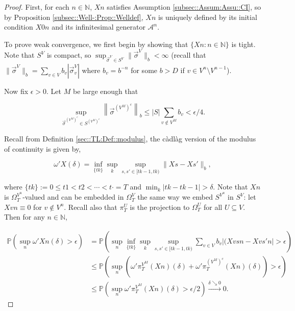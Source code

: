 \documentclass[12pt]{article}
\newcommand{\mb}{\mathbb}
\newcommand{\mc}{\mathcal}
\newcommand{\ra}{\rightarrow}
\newcommand{\os}{\overset}
\newcommand{\ep}{\epsilon}
\newcommand{\ind}{\hspace{24pt}}
\newcommand{\pr}{\mb{P}}							%
\renewcommand{\v}{v}							%
\renewcommand{\U}{U}							%
\renewcommand{\S}{S}							%
\newcommand{\s}{\sigma}							%
\newcommand{\sv}{\vec{\s}}						%
\renewcommand{\b}{b}							%
\newcommand{\T}{T}								%
\renewcommand{\t}{t}							%
\newcommand{\sset}{\Omega}						%
\newcommand{\proj}{\pi}							%
\renewcommand{\tt}{s}							%
\newcommand{\ttt}{s'}							%
\newcommand{\X}{X}								%
\newcommand{\IG}{\mc{A}}						%
\newcommand{\carp}[1]{^{#1}}					%
\newcommand{\vsi}[1]{^{#1}}						%
\newcommand{\cind}[1]{_{#1}}					%
\newcommand{\ts}[1]{_{#1}}						%
\newcommand{\degr}{D}							%
\newcommand{\sln}[1]{^{#1}}						%
\newcommand{\cconst}{M}							%
\newcommand{\cmodu}{\omega'}					%
\renewcommand{\it}{k}							%
\begin{document}
\begin{proof}
First, for each \(n\in\mb{N}\), \(\X{}{}{n}\) satisfies Assumption \ref{subsec::Assum:Assu::CI}, so by Proposition \ref{subsec::Well-:Prop::Welldef}, \(\X{}{}{n}\) is uniquely defined by its initial condition \(\X{}{0}{n}\) and its infinitesimal generator \(\IG\sln{n}\).

\ind To prove weak convergence, we first begin by showing that \(\{\X{}{}{n}:n\in \mb{N}\}\) is tight. Note that \(\S\carp{V}\) is compact, so \(\sup_{\sv\cind{}\vsi{V} \in \S\carp{V}} \|\sv\cind{}\vsi{V}\|_{\b} < \infty\) (recall that \(\|\sv\cind{}\vsi{V}\|_{\b} = \sum_{\v \in V} \b\cind{\v} |\sv\cind{\v}\vsi{V}|\) where \(\b\cind{\v} = \b^{-n}\) for some \(\b > \degr\) if \(\v \in V\sln{n}\setminus V\sln{n-1}\)).

\ind Now fix \(\ep > 0\). Let \(\cconst\) be large enough that

\[\sup_{\sv\cind{}\vsi{\left(V\sln{\cconst}\right)^c} \in \S\carp{\left(V\sln{\cconst}\right)^c}} \left\|\sv\cind{}\vsi{\left(V\sln{\cconst}\right)^c}\right\|_{\b} \leq |\S|\sum_{\v \notin V\sln{\cconst}} \b\cind{\v} < \ep/4.\]

Recall from Definition \ref{sec::TL:Def::modulus}, the c\`adl\`ag version of the modulus of continuity is given by,

\[\cmodu{\X{}{}}(\delta) = \inf_{\{\t{\it}\}} \sup_\it \sup_{\tt,\ttt \in [\t{\it-1},\t{\it})} \|\X{}{\tt} - \X{}{\ttt}\|_{\b},\]

where \(\{\t{\it}\} := 0 \leq \t{1} < \t{2} < \cdots < \t{\cdot} = \T\) and \(\min_\it|\t{\it} - \t{\it-1}| > \delta\). Note that \(\X{}{}{n}\) is \(\sset\vsi{V\sln{n}}\ts{\T}\)-valued and can be embedded in \(\sset\vsi{V}\ts{\T}\) the same way we embed \(\S\carp{V\sln{n}}\) in \(\S\carp{V}\): let \(\X{\v}{}{n} \equiv 0\) for \(\v \notin V\sln{n}\). Recall also that \(\proj\vsi{\U}\ts{\T}\) is the projection to \(\sset\vsi{\U}\ts{\T}\) for all \(\U\subseteq V\). Then for any \(n\in \mb{N}\),

\begin{align*}
\pr\left(\sup_n \cmodu{\X{}{}{n}}(\delta) > \epsilon\right) &= \pr\left(\sup_n\inf_{\{\t{\it}\}}\sup_\it\sup_{\tt,\ttt \in [\t{\it-1},\t{\it})} \sum_{\v \in V} \b\cind{\v}|(\X{\v}{\tt}{n} - \X{\v}{\ttt}{n}| > \epsilon \right)\\
&\leq \pr\left(\sup_n \left(\cmodu{\proj\vsi{V\sln{\cconst}}\ts{\T}(\X{}{}{n})}(\delta) + \cmodu{\proj\vsi{\left(V\sln{\cconst}\right)^c}\ts{\T}(\X{}{}{n})}(\delta)\right) > \ep\right)\\
&\leq \pr\left(\sup_n \cmodu{\proj\vsi{V\sln{\cconst}}\ts{\T}(\X{}{}{n})}(\delta) > \ep/2\right) \os{\delta\searrow 0}{\ra} 0.
\end{align*}


\end{proof}
\end{document}
